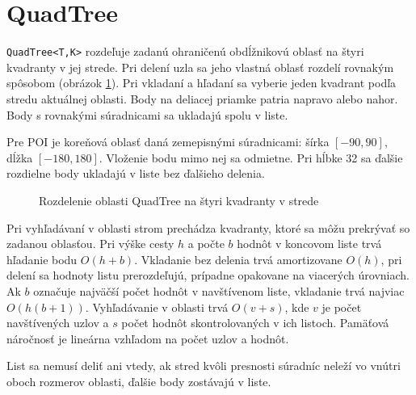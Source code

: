 \documentclass[12pt,a4paper,oneside]{report}
\begin{document}
\section{QuadTree}
\texttt{QuadTree<T,K>} rozdeľuje zadanú ohraničenú obdĺžnikovú oblasť
na štyri kvadranty v jej strede. Pri delení uzla sa jeho vlastná oblasť
rozdelí rovnakým spôsobom (obrázok \ref{fig:quadrants}). Pri vkladaní a hľadaní
sa vyberie jeden kvadrant podľa stredu aktuálnej oblasti. Body na
deliacej priamke patria napravo alebo nahor. Body s rovnakými
súradnicami sa ukladajú spolu v liste.

Pre POI je koreňová oblasť daná zemepisnými súradnicami:
šírka \([-90,90]\), dĺžka \([-180,180]\). Vloženie bodu mimo nej sa
odmietne. Pri hĺbke 32 sa ďalšie rozdielne body ukladajú v liste bez
ďalšieho delenia.

\begin{figure}[H]
\centering
{}
\caption{Rozdelenie oblasti QuadTree na štyri kvadranty v strede}
\label{fig:quadrants}
\end{figure}

Pri vyhľadávaní v oblasti strom prechádza kvadranty, ktoré sa môžu
prekrývať so zadanou oblasťou. Pri výške cesty \(h\) a počte \(b\)
hodnôt v koncovom liste trvá hľadanie bodu \(O(h+b)\). Vkladanie bez
delenia trvá amortizovane \(O(h)\), pri delení sa hodnoty listu
prerozdeľujú, prípadne opakovane na viacerých úrovniach. Ak \(b\)
označuje najväčší počet hodnôt v navštívenom liste, vkladanie trvá
najviac \(O(h(b+1))\).
Vyhľadávanie v oblasti trvá \(O(v+s)\), kde \(v\) je počet navštívených
uzlov a \(s\) počet hodnôt skontrolovaných v ich listoch. Pamäťová
náročnosť je lineárna vzhľadom na počet uzlov a hodnôt.

List sa nemusí deliť ani vtedy, ak stred kvôli presnosti súradníc neleží
vo vnútri oboch rozmerov oblasti, ďalšie body zostávajú v liste.
\end{document}

